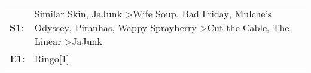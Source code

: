 \begin{supertabular}{p{0.03\textwidth}p{0.92\textwidth}}
 \textbf{S1}:  &  Similar Skin\textsuperscript{}, \enspace JaJunk\textsuperscript{} \textgreater \enspace Wife Soup\textsuperscript{}, \enspace Bad Friday\textsuperscript{}, \enspace Mulche's Odyssey\textsuperscript{}, \enspace Piranhas\textsuperscript{}, \enspace Wappy Sprayberry\textsuperscript{} \textgreater \enspace Cut the Cable\textsuperscript{}, \enspace The Linear\textsuperscript{} \textgreater \enspace JaJunk\textsuperscript{}  \enspace  \\
 \textbf{E1}:  &                                                                                                                                                                                                                                                                                                                                                                                                             Ringo[1]\textsuperscript{}  \enspace  \\
\end{supertabular}
